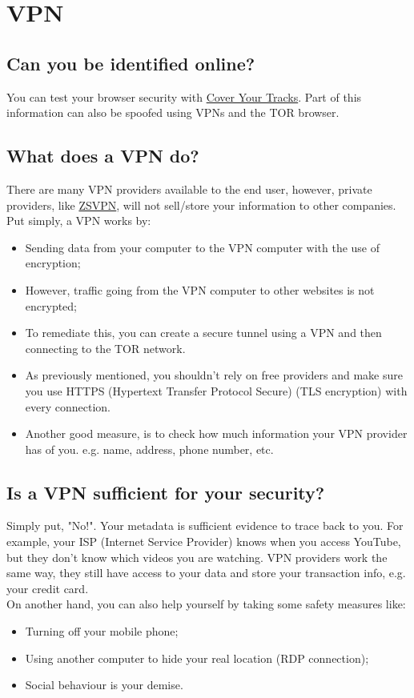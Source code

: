 \documentclass[11pt,a4paper]{report}
\begin{document}
\section{VPN}
\subsection{Can you be identified online?}
You can test your browser security with \href{coveryourtracks.eff.org}{Cover Your Tracks}. Part of this information can also be spoofed using VPNs and the TOR browser.
\subsection{What does a VPN do?}
There are many VPN providers available to the end user, however, private providers, like \href{https://zsvpn.com}{ZSVPN}, will not sell/store your information to other companies. Put simply, a VPN works by:
\begin{itemize}
    \item Sending data from your computer to the VPN computer with the use of encryption;
    \item However, traffic going from the VPN computer to other websites is not encrypted;
    \item To remediate this, you can create a secure tunnel using a VPN and then connecting to the TOR network.
    \item As previously mentioned, you shouldn't rely on free providers and make sure you use HTTPS (Hypertext Transfer Protocol Secure) (TLS encryption) with every connection.
    \item Another good measure, is to check how much information your VPN provider has of you. e.g. name, address, phone number, etc.
\end{itemize}
\subsection{Is a VPN sufficient for your security?}
Simply put, "No!". Your metadata is sufficient evidence to trace back to you. For example, your ISP (Internet Service Provider) knows when you access YouTube, but they don't know which videos you are watching.
VPN providers work the same way, they still have access to your data and store your transaction info, e.g. your credit card.
\\ On another hand, you can also help yourself by taking some safety measures like:
\begin{itemize}
    \item Turning off your mobile phone;
    \item Using another computer to hide your real location (RDP connection);
    \item Social behaviour is your demise.
\end{itemize}
\end{document}
